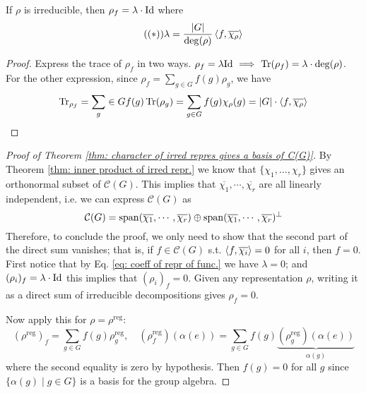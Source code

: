 \documentclass{article}
\begin{document}
\begin{proposition}
    If $\rho$ is irreducible, then $\rho_f = \lambda \cdot \mathrm{Id}$ where
    \begin{equation}\label{eq: coeff of repr of func.}\tag{$(\ast)$}
        \lambda = \frac{\left|G\right|}{\deg(\rho)} \left\langle f, \overline{\chi_{\rho}} \right\rangle
    \end{equation}
\end{proposition}

\begin{proof}
    Express the trace of $\rho_f$ in two ways. $\rho_f = \lambda \mathrm{Id} \ \Longrightarrow\  \operatorname{Tr}(\rho_f) = \lambda \cdot \deg(\rho)$. For the other expression, since $\rho_f = \sum_{g \in G} f(g) \rho_g$, we have
    \[
        \operatorname{Tr}_{\rho_f} = \sum_g \in G f(g) \operatorname{Tr}(\rho_g) = \sum_{g \in G} f(g) \chi_{\rho}(g) = \left|G\right| \cdot \left\langle f, \overline{\chi_{\rho}} \right\rangle
    \]
\end{proof}

\begin{proof}[Proof of Theorem \ref{thm: character of irred repres gives a basis of C(G)}]
    By Theorem \ref{thm: inner product of irred repr.} we know that $\{\chi_1, \dots, \chi_r\}$ gives an orthonormal subset of $\mathcal{C}(G)$. This implies that $\overline{\chi_{1}}, \cdots, \overline{\chi_{r}}$ are all linearly independent, i.e. we can express $\mathcal{C}(G)$ as
    \[
        \mathcal{C}(G) = \operatorname{span}(\overline{\chi_{1}}, \cdots, \overline{\chi_{r}}) \oplus \operatorname{span}(\overline{\chi_{1}}, \cdots, \overline{\chi_{r}})^{\perp}
    \]
    Therefore, to conclude the proof, we only need to show that the second part of the direct sum vanishes; that is, if $f \in \mathcal{C}(G)$ s.t. $\left\langle f, \overline{\chi_i} \right\rangle = 0$ for all $i$, then $f = 0$. First notice that by Eq. \eqref{eq: coeff of repr of func.} we have $\lambda = 0$; and $(\rho_i)_f = \lambda \cdot \mathrm{Id}$ this implies that $(\rho_i)_f = 0$. Given any representation $\rho$, writing it as a direct sum of irreducible decompositions gives $\rho_f = 0$.

    Now apply this for $\rho = \rho^{\text{reg}}$:
    \[
        (\rho^{\text{reg}})_f = \sum_{g \in G} f(g) \rho^{\text{reg}}_g, \quad (\rho^{\text{reg}}_f) (\alpha(e)) = \sum_{g \in G} f(g) \underbrace{(\rho^{\text{reg}}_g) (\alpha(e))}_{\alpha(g)}
    \]
    where the second equality is zero by hypothesis. Then $f(g) = 0$ for all $g$ since $\{\alpha(g) \mid g \in G\}$ is a basis for the group algebra.
\end{proof}
\end{document}
